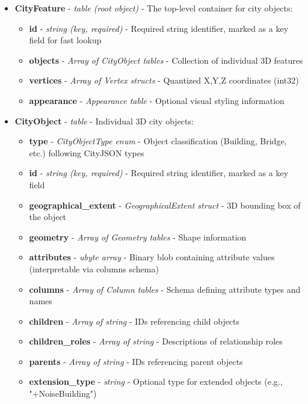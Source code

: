 \begin{itemize}
  \item \textbf{CityFeature} - \textit{table (root object)} - The top-level container for city objects:
    \begin{itemize}
      \item \textbf{id} - \textit{string (key, required)} - Required string identifier, marked as a key field for fast lookup
      \item \textbf{objects} - \textit{Array of CityObject tables} - Collection of individual 3D features
      \item \textbf{vertices} - \textit{Array of Vertex structs} - Quantized X,Y,Z coordinates (int32)
      \item \textbf{appearance} - \textit{Appearance table} - Optional visual styling information
    \end{itemize}

  \item \textbf{CityObject} - \textit{table} - Individual 3D city objects:
    \begin{itemize}
      \item \textbf{type} - \textit{CityObjectType enum} - Object classification (Building, Bridge, etc.) following CityJSON types \citep{cityjson_spec}
      \item \textbf{id} - \textit{string (key, required)} - Required string identifier, marked as a key field
      \item \textbf{geographical\_extent} - \textit{GeographicalExtent struct} - 3D bounding box of the object
      \item \textbf{geometry} - \textit{Array of Geometry tables} - Shape information
      \item \textbf{attributes} - \textit{ubyte array} - Binary blob containing attribute values (interpretable via columns schema)
      \item \textbf{columns} - \textit{Array of Column tables} - Schema defining attribute types and names
      \item \textbf{children} - \textit{Array of string} - IDs referencing child objects
      \item \textbf{children\_roles} - \textit{Array of string} - Descriptions of relationship roles
      \item \textbf{parents} - \textit{Array of string} - IDs referencing parent objects
      \item \textbf{extension\_type} - \textit{string} - Optional type for extended objects (e.g., "+NoiseBuilding")
    \end{itemize}
\end{itemize}

